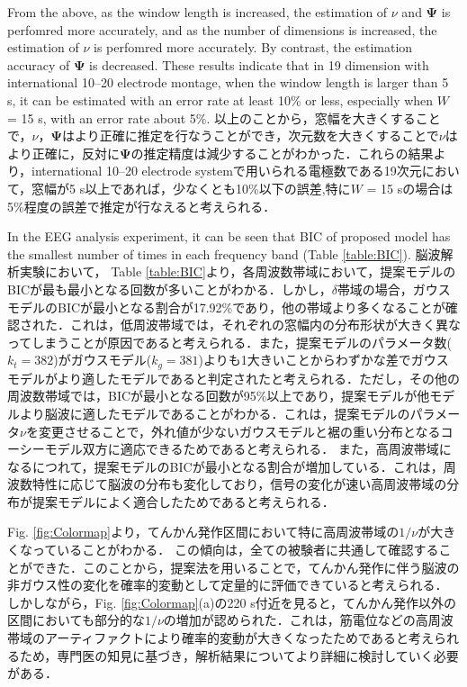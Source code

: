 \documentclass[journal]{IEEEtran}
\begin{document}
From the above, as the window length is increased, the estimation of $\nu$ and $\mathbf{\Psi}$ is perfomred more accurately, and as the number of dimensions is increased, the estimation of $\nu$ is perfomred more accurately. By contrast, the estimation accuracy of $\mathbf{\Psi}$ is decreased.
These results indicate that in 19 dimension with international 10--20 electrode montage, when the window length is larger than 5 s, it can be estimated with an error rate at least 10\% or less, especially when $W$ = 15 s, with an error rate about 5\%. %
以上のことから，窓幅を大きくすることで，$\nu$，$\mathbf{\Psi}$はより正確に推定を行なうことができ，次元数を大きくすることで$\nu$はより正確に，反対に$\mathbf{\Psi}$の推定精度は減少することがわかった．これらの結果より，international 10--20 electrode systemで用いられる電極数である19次元において，窓幅が5 s以上であれば，少なくとも10\%以下の誤差,特に$W$ = 15 sの場合は5\%程度の誤差で推定が行なえると考えられる．

In the EEG analysis experiment, it can be seen that BIC of proposed model has the smallest number of times in each frequency band (Table \ref{table:BIC}).
脳波解析実験において，
Table \ref{table:BIC}より，各周波数帯域において，提案モデルのBICが最も最小となる回数が多いことがわかる．しかし，$\delta$帯域の場合，ガウスモデルのBICが最小となる割合が17.92\%であり，他の帯域より多くなることが確認された．これは，低周波帯域では，それぞれの窓幅内の分布形状が大きく異なってしまうことが原因であると考えられる．また，提案モデルのパラメータ数($k_t=382$)がガウスモデル($k_g=381$)よりも1大きいことからわずかな差でガウスモデルがより適したモデルであると判定されたと考えられる．ただし，その他の周波数帯域では，BICが最小となる回数が95\%以上であり，提案モデルが他モデルより脳波に適したモデルであることがわかる．これは，提案モデルのパラメータ$\nu$を変更させることで，外れ値が少ないガウスモデルと裾の重い分布となるコーシーモデル双方に適応できるためであると考えられる．
また，高周波帯域になるにつれて，提案モデルのBICが最小となる割合が増加している．これは，周波数特性に応じて脳波の分布も変化しており，信号の変化が速い高周波帯域の分布が提案モデルによく適合したためであると考えられる．

Fig. \ref{fig:Colormap}より，てんかん発作区間において特に高周波帯域の$1/\nu$が大きくなっていることがわかる．
この傾向は，全ての被験者に共通して確認することができた．このことから，提案法を用いることで，てんかん発作に伴う脳波の非ガウス性の変化を確率的変動として定量的に評価できていると考えられる．
しかしながら，Fig. \ref{fig:Colormap}(a)の220 s付近を見ると，てんかん発作以外の区間においても部分的な$1/\nu$の増加が認められた．これは，筋電位などの高周波帯域のアーティファクトにより確率的変動が大きくなったためであると考えられるため，専門医の知見に基づき，解析結果についてより詳細に検討していく必要がある．
\end{document}
